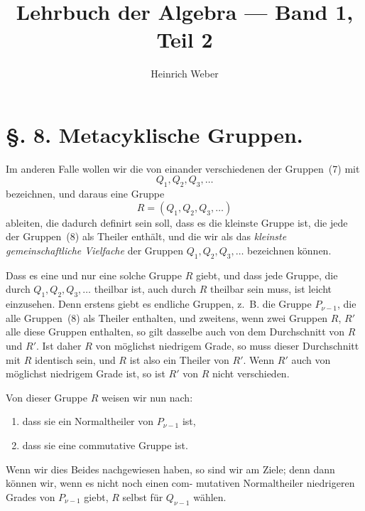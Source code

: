 \documentclass[12pt,a4paper]{article}
\title{\textbf{Lehrbuch der Algebra --- Band 1, Teil 2}}
\author{Heinrich Weber}
\date{}
\theoremstyle{plain}
\theoremstyle{definition}
\theoremstyle{remark}
\begin{document}
\maketitle

\section*{\S. 8. Metacyklische Gruppen.}

Im anderen Falle wollen wir die von einander verschiedenen
der Gruppen~(7) mit
\begin{equation}\tag{8}
Q_1, Q_2, Q_3, \ldots
\end{equation}
bezeichnen, und daraus eine Gruppe
\begin{equation}\tag{9}
R = (Q_1, Q_2, Q_3, \ldots)
\end{equation}
ableiten, die dadurch definirt sein soll, dass es die kleinste
Gruppe ist, die jede der Gruppen~(8) als Theiler enthält, und
die wir als das \emph{kleinste gemeinschaftliche Vielfache} der
Gruppen $Q_1, Q_2, Q_3, \ldots$ bezeichnen können.

Dass es eine und nur eine solche Gruppe $R$ giebt, und dass
jede Gruppe, die durch $Q_1, Q_2, Q_3, \ldots$ theilbar ist, auch durch
$R$ theilbar sein muss, ist leicht einzusehen. Denn erstens giebt
es endliche Gruppen, z.~B. die Gruppe $P_{\nu-1}$, die alle Gruppen~(8)
als Theiler enthalten, und zweitens, wenn zwei Gruppen $R$, $R'$
alle diese Gruppen enthalten, so gilt dasselbe auch von dem
Durchschnitt von $R$ und $R'$. Ist daher $R$ von möglichst niedrigem
Grade, so muss dieser Durchschnitt mit $R$ identisch sein, und $R$
ist also ein Theiler von $R'$. Wenn $R'$ auch von möglichst
niedrigem Grade ist, so ist $R'$ von $R$ nicht verschieden.

Von dieser Gruppe $R$ weisen wir nun nach:
\begin{enumerate}[label=\alph*)]
\item dass sie ein Normaltheiler von $P_{\nu-1}$ ist,
\item dass sie eine commutative Gruppe ist.
\end{enumerate}

Wenn wir dies Beides nachgewiesen haben, so sind wir am
Ziele; denn dann können wir, wenn es nicht noch einen com-
mutativen Normaltheiler niedrigeren Grades von $P_{\nu-1}$ giebt,
$R$ selbst für $Q_{\nu-1}$ wählen.
\end{document}
